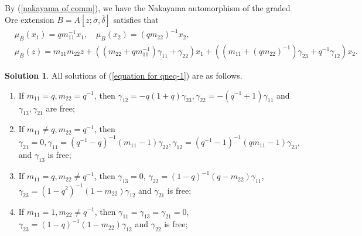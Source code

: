 \documentclass[a4paper,10pt]{amsart}
\theoremstyle{definition}
\newtheorem{solution}[theorem]{Solution}
\numberwithin{equation}{section}
\begin{document}
By (\ref{nakayama of comm}), we have the Nakayama automorphism of the graded Ore extension $B=A[z;\overline{\sigma},\overline{\delta}]$ satisfies that
 \begin{equation}\label{naka equa for qneq-1}
 \begin{aligned}
    &\mu_B(x_1)=qm_{11}^{-1}x_1,\quad \mu_B(x_2)=(qm_{22})^{-1}x_2,\\ &\mu_B(z)=m_{11}m_{22}z+((m_{22}+qm_{11}^{-1})\gamma_{11}+\gamma_{22})x_1+((m_{11}+(qm_{22})^{-1})\gamma_{23}+q^{-1}\gamma_{12})x_2.
    \end{aligned}
    \end{equation}

\begin{solution}\label{solution: qneq-1}
All solutions of (\ref{equation for qneq-1}) are as follows.
\begin{enumerate}
\item If $m_{11}=q,m_{22}=q^{-1}$, then $\gamma_{12}=-q(1+q)\gamma_{23},\gamma_{22}=-(q^{-1}+1)\gamma_{11}$ and $\gamma_{13},\gamma_{21}$ are free;%

\item If $m_{11}\neq q,m_{22}=q^{-1}$, then $\gamma_{21}=0,\gamma_{11}=(q^{-1}-q)^{-1}(m_{11}-1)\gamma_{22},\gamma_{12}=(q^{-1}-1)^{-1}(qm_{11}-1)\gamma_{23}$, and $\gamma_{13}$ is free;%
\item If $m_{11}=q,m_{22}\neq q^{-1}$, then $\gamma_{13}=0$, $\gamma_{22}=(1-q)^{-1}(q-m_{22})\gamma_{11}$, $\gamma_{23}=(1-q^2)^{-1}(1-m_{22})\gamma_{12}$ and $\gamma_{21}$ is free;%

\item If $m_{11}=1,m_{22}\neq q^{-1}$, then $\gamma_{11}=\gamma_{13}=\gamma_{21}=0$, $\gamma_{23}=(1-q)^{-1}(1-m_{22})\gamma_{12}$ and $\gamma_{22}$ is free;%


\end{enumerate}
\end{solution}
\end{document}
